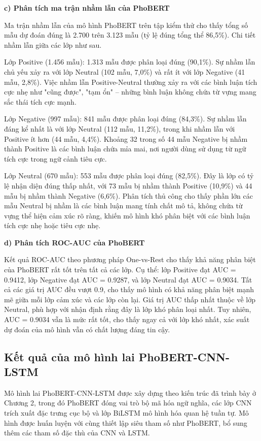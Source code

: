 \documentclass[14pt, a4paper]{report}
\begin{document}
\textbf{c) Phân tích ma trận nhầm lẫn của PhoBERT}


Ma trận nhầm lẫn của mô hình PhoBERT trên tập kiểm thử cho thấy tổng số mẫu dự đoán đúng là 2.700 trên 3.123 mẫu (tỷ lệ đúng tổng thể 86,5\%). Chi tiết nhầm lẫn giữa các lớp như sau.


Lớp Positive (1.456 mẫu): 1.313 mẫu được phân loại đúng (90,1\%). Sự nhầm lẫn chủ yếu xảy ra với lớp Neutral (102 mẫu, 7,0\%) và rất ít với lớp Negative (41 mẫu, 2,8\%). Việc nhầm lẫn Positive-Neutral thường xảy ra với các bình luận tích cực nhẹ như "cũng được", "tạm ổn" – những bình luận không chứa từ vựng mang sắc thái tích cực mạnh.


Lớp Negative (997 mẫu): 841 mẫu được phân loại đúng (84,3\%). Sự nhầm lẫn đáng kể nhất là với lớp Neutral (112 mẫu, 11,2\%), trong khi nhầm lẫn với Positive ít hơn (44 mẫu, 4,4\%). Khoảng 32 trong số 44 mẫu Negative bị nhầm thành Positive là các bình luận chứa mỉa mai, nơi người dùng sử dụng từ ngữ tích cực trong ngữ cảnh tiêu cực.


Lớp Neutral (670 mẫu): 553 mẫu được phân loại đúng (82,5\%). Đây là lớp có tỷ lệ nhận diện đúng thấp nhất, với 73 mẫu bị nhầm thành Positive (10,9\%) và 44 mẫu bị nhầm thành Negative (6,6\%). Phân tích thủ công cho thấy phần lớn các mẫu Neutral bị nhầm là các bình luận mang tính chất mô tả, không chứa từ vựng thể hiện cảm xúc rõ ràng, khiến mô hình khó phân biệt với các bình luận tích cực nhẹ hoặc tiêu cực nhẹ.


\textbf{d) Phân tích ROC-AUC của PhoBERT}


Kết quả ROC-AUC theo phương pháp One-vs-Rest cho thấy khả năng phân biệt của PhoBERT rất tốt trên tất cả các lớp. Cụ thể: lớp Positive đạt AUC = 0.9412, lớp Negative đạt AUC = 0.9287, và lớp Neutral đạt AUC = 0.9034. Tất cả các giá trị AUC đều vượt 0.9, cho thấy mô hình có khả năng phân biệt mạnh mẽ giữa mỗi lớp cảm xúc và các lớp còn lại. Giá trị AUC thấp nhất thuộc về lớp Neutral, phù hợp với nhận định rằng đây là lớp khó phân loại nhất. Tuy nhiên, AUC = 0.9034 vẫn là mức rất tốt, cho thấy ngay cả với lớp khó nhất, xác suất dự đoán của mô hình vẫn có chất lượng đáng tin cậy.


\subsection{Kết quả của mô hình lai PhoBERT-CNN-LSTM}


Mô hình lai PhoBERT-CNN-LSTM được xây dựng theo kiến trúc đã trình bày ở Chương 2, trong đó PhoBERT đóng vai trò bộ mã hóa ngữ nghĩa, các lớp CNN trích xuất đặc trưng cục bộ và lớp BiLSTM mô hình hóa quan hệ tuần tự. Mô hình được huấn luyện với cùng thiết lập siêu tham số như PhoBERT, bổ sung thêm các tham số đặc thù của CNN và LSTM.
\end{document}
